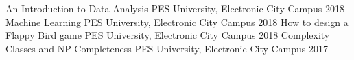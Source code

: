 
\begin{cvhonors}
    \cvhonor
        {An Introduction to Data Analysis}
        {PES University, Electronic City Campus}
        {}
        {2018}
    \cvhonor
        {Machine Learning}
        {PES University, Electronic City Campus}
        {}
        {2018}
    \cvhonor
        {How to design a Flappy Bird game}
        {PES University, Electronic City Campus}
        {}
        {2018}
    \cvhonor
        {Complexity Classes and NP-Completeness}
        {PES University, Electronic City Campus}
        {}
        {2017}
\end{cvhonors}
